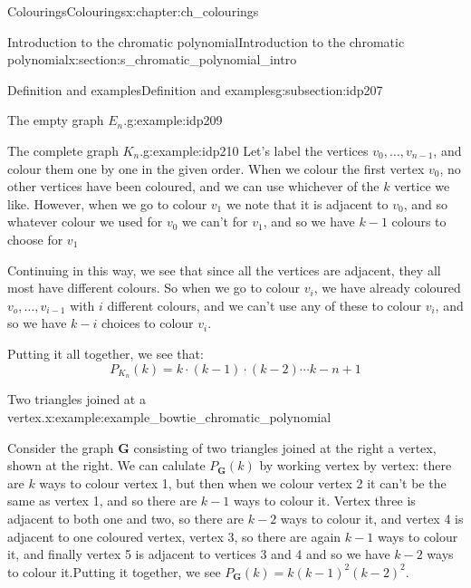 \documentclass[oneside,10pt,]{book}
\numberwithin{equation}{section}
\newcommand{\bfG}{\mathbf{G}}
\begin{document}
\begin{chapterptx}{Colourings}{}{Colourings}{}{}{x:chapter:ch_colourings}
\begin{sectionptx}{Introduction to the chromatic polynomial}{}{Introduction to the chromatic polynomial}{}{}{x:section:s_chromatic_polynomial_intro}
\begin{subsectionptx}{Definition and examples}{}{Definition and examples}{}{}{g:subsection:idp207}
\begin{example}{The empty graph \(E_n\).}{g:example:idp209}
\end{example}
\begin{example}{The complete graph \(K_n\).}{g:example:idp210}%
Let's label the vertices \(v_0,\dots, v_{n-1}\), and colour them one by one in the given order.  When we colour the first vertex \(v_0\), no other vertices have been coloured, and we can use whichever of the \(k\) vertice we like.  However, when we go to colour \(v_1\) we note that it is adjacent to \(v_0\), and so whatever colour we used for \(v_0\) we can't for \(v_1\), and so we have \(k-1\) colours to choose for \(v_1\)%
\par
Continuing in this way, we see that since all the vertices are adjacent, they all most have different colours.  So when we go to colour \(v_i\), we have already coloured \(v_o,\dots, v_{i-1}\) with \(i\) different colours, and we can't use any of these to colour \(v_i\), and so we have \(k-i\) choices to colour \(v_i\).%
\par
Putting it all together, we see that:%
\begin{equation*}
P_{K_n}(k)=k\cdot (k-1)\cdot (k-2)\cdots k-n+1
\end{equation*}
%
\end{example}
\begin{example}{Two triangles joined at a vertex.}{x:example:example_bowtie_chromatic_polynomial}%
\begin{sidebyside}{2}{0.025}{0.025}{0.05}%
\begin{sbspanel}{0.6}%
Consider the graph \(\bfG\) consisting of two triangles joined at the right a vertex, shown at the right.  We can calulate \(P_\bfG(k)\) by working vertex by vertex: there are \(k\) ways to colour vertex 1, but then when we colour vertex 2 it can't be the same as vertex 1, and so there are \(k-1\) ways to colour it.  Vertex three is adjacent to both one and two, so there are \(k-2\) ways to colour it, and vertex 4 is adjacent to one coloured vertex, vertex 3, so there are again \(k-1\) ways to colour it, and finally vertex 5 is adjacent to vertices 3 and 4 and so we have \(k-2\) ways to colour it.Putting it together, we see \(P_\bfG(k)=k(k-1)^2(k-2)^2\).%
\end{sbspanel}%
\begin{sbspanel}{0.3}%
\end{sbspanel}
\end{sidebyside}
\end{example}
\end{subsectionptx}
\end{sectionptx}
\end{chapterptx}
\end{document}
